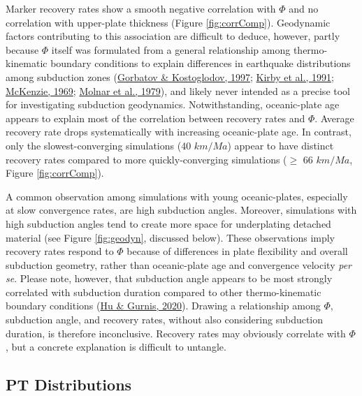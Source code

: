 Marker recovery rates show a smooth negative correlation with \(\Phi\) and no correlation with upper-plate thickness (Figure \ref{fig:corrComp}). Geodynamic factors contributing to this association are difficult to deduce, however, partly because \(\Phi\) itself was formulated from a general relationship among thermo-kinematic boundary conditions to explain differences in earthquake distributions among subduction zones (\protect\hyperlink{ref-gorbatov1997}{Gorbatov \& Kostoglodov, 1997}; \protect\hyperlink{ref-kirby1991}{Kirby et al., 1991}; \protect\hyperlink{ref-mckenzie1969}{McKenzie, 1969}; \protect\hyperlink{ref-molnar1979}{Molnar et al., 1979}), and likely never intended as a precise tool for investigating subduction geodynamics. Notwithstanding, oceanic-plate age appears to explain most of the correlation between recovery rates and \(\Phi\). Average recovery rate drops systematically with increasing oceanic-plate age. In contrast, only the slowest-converging simulations (40 \(km/Ma\)) appear to have distinct recovery rates compared to more quickly-converging simulations (\(\geq\) 66 \(km/Ma\), Figure \ref{fig:corrComp}).

A common observation among simulations with young oceanic-plates, especially at slow convergence rates, are high subduction angles. Moreover, simulations with high subduction angles tend to create more space for underplating detached material (see Figure \ref{fig:geodyn}, discussed below). These observations imply recovery rates respond to \(\Phi\) because of differences in plate flexibility and overall subduction geometry, rather than oceanic-plate age and convergence velocity \emph{per se}. Please note, however, that subduction angle appears to be most strongly correlated with subduction duration compared to other thermo-kinematic boundary conditions (\protect\hyperlink{ref-hu2020}{Hu \& Gurnis, 2020}). Drawing a relationship among \(\Phi\), subduction angle, and recovery rates, without also considering subduction duration, is therefore inconclusive. Recovery rates may obviously correlate with \(\Phi\), but a concrete explanation is difficult to untangle.

\hypertarget{pt-distributions}{%
\subsection{PT Distributions}\label{pt-distributions}}

